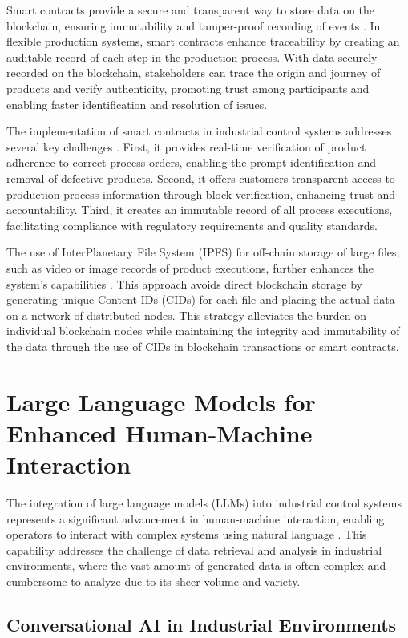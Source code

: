 Smart contracts provide a secure and transparent way to store data on the blockchain, ensuring immutability and tamper-proof recording of events \cite{chen2019collaborative}. In flexible production systems, smart contracts enhance traceability by creating an auditable record of each step in the production process. With data securely recorded on the blockchain, stakeholders can trace the origin and journey of products and verify authenticity, promoting trust among participants and enabling faster identification and resolution of issues.

The implementation of smart contracts in industrial control systems addresses several key challenges \cite{maw2019ics}. First, it provides real-time verification of product adherence to correct process orders, enabling the prompt identification and removal of defective products. Second, it offers customers transparent access to production process information through block verification, enhancing trust and accountability. Third, it creates an immutable record of all process executions, facilitating compliance with regulatory requirements and quality standards.

The use of InterPlanetary File System (IPFS) for off-chain storage of large files, such as video or image records of product executions, further enhances the system's capabilities \cite{benet2014ipfs}. This approach avoids direct blockchain storage by generating unique Content IDs (CIDs) for each file and placing the actual data on a network of distributed nodes. This strategy alleviates the burden on individual blockchain nodes while maintaining the integrity and immutability of the data through the use of CIDs in blockchain transactions or smart contracts.

\section{Large Language Models for Enhanced Human-Machine Interaction}

The integration of large language models (LLMs) into industrial control systems represents a significant advancement in human-machine interaction, enabling operators to interact with complex systems using natural language \cite{chang2024survey}. This capability addresses the challenge of data retrieval and analysis in industrial environments, where the vast amount of generated data is often complex and cumbersome to analyze due to its sheer volume and variety.

\subsection{Conversational AI in Industrial Environments}

